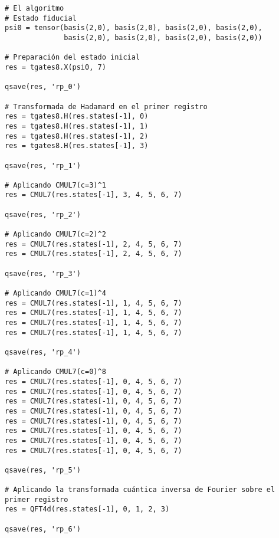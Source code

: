 \begin{verbatim}
# El algoritmo
# Estado fiducial
psi0 = tensor(basis(2,0), basis(2,0), basis(2,0), basis(2,0),
              basis(2,0), basis(2,0), basis(2,0), basis(2,0))

# Preparación del estado inicial
res = tgates8.X(psi0, 7)

qsave(res, 'rp_0')

# Transformada de Hadamard en el primer registro
res = tgates8.H(res.states[-1], 0)
res = tgates8.H(res.states[-1], 1)
res = tgates8.H(res.states[-1], 2)
res = tgates8.H(res.states[-1], 3)

qsave(res, 'rp_1')

# Aplicando CMUL7(c=3)^1
res = CMUL7(res.states[-1], 3, 4, 5, 6, 7)

qsave(res, 'rp_2')

# Aplicando CMUL7(c=2)^2
res = CMUL7(res.states[-1], 2, 4, 5, 6, 7)
res = CMUL7(res.states[-1], 2, 4, 5, 6, 7)

qsave(res, 'rp_3')

# Aplicando CMUL7(c=1)^4
res = CMUL7(res.states[-1], 1, 4, 5, 6, 7)
res = CMUL7(res.states[-1], 1, 4, 5, 6, 7)
res = CMUL7(res.states[-1], 1, 4, 5, 6, 7)
res = CMUL7(res.states[-1], 1, 4, 5, 6, 7)

qsave(res, 'rp_4')

# Aplicando CMUL7(c=0)^8
res = CMUL7(res.states[-1], 0, 4, 5, 6, 7)
res = CMUL7(res.states[-1], 0, 4, 5, 6, 7)
res = CMUL7(res.states[-1], 0, 4, 5, 6, 7)
res = CMUL7(res.states[-1], 0, 4, 5, 6, 7)
res = CMUL7(res.states[-1], 0, 4, 5, 6, 7)
res = CMUL7(res.states[-1], 0, 4, 5, 6, 7)
res = CMUL7(res.states[-1], 0, 4, 5, 6, 7)
res = CMUL7(res.states[-1], 0, 4, 5, 6, 7)

qsave(res, 'rp_5')

# Aplicando la transformada cuántica inversa de Fourier sobre el primer registro
res = QFT4d(res.states[-1], 0, 1, 2, 3)

qsave(res, 'rp_6')

\end{verbatim}

